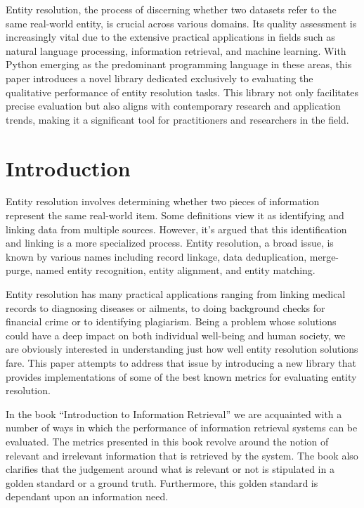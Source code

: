 \documentclass[11pt]{article}
\begin{document}
    \theoremstyle{definition}
    \newtheorem{defn}{Definition}[section]
    
    \abstract\label{abstract}

    Entity resolution, the process of discerning whether two datasets refer to
    the same real-world entity, is crucial across various domains.
    Its quality assessment is increasingly vital due to the extensive practical
    applications in fields such as natural language processing, information
    retrieval, and machine learning.
    With Python emerging as the predominant programming language in these areas,
    this paper introduces a novel library dedicated exclusively to evaluating
    the qualitative performance of entity resolution tasks.
    This library not only facilitates precise evaluation but also aligns with
    contemporary research and application trends, making it a significant tool
    for practitioners and researchers in the field.


    \section{Introduction}\label{sec:introduction}
    Entity resolution involves determining whether two pieces of information
    represent the same real-world item.
    Some definitions view it as identifying and linking data from multiple
    sources\cite{Qia17}.
    However, it's argued that this identification and linking is a more
    specialized process\cite{Tal11}.
    Entity resolution, a broad issue, is known by various names including record
    linkage, data deduplication, merge-purge, named entity recognition, entity
    alignment, and entity matching.

    Entity resolution has many practical applications ranging from linking
    medical records to diagnosing diseases or ailments, to doing background
    checks for financial crime or to identifying plagiarism.
    Being a problem whose solutions could have a deep impact on both individual
    well-being and human society, we are obviously interested in understanding
    just how well entity resolution solutions fare.
    This paper attempts to address that issue by introducing a new library that
    provides implementations of some of the best known metrics for evaluating
    entity resolution.

    In the book ``Introduction to Information Retrieval'' we are acquainted with
    a number of ways in which the performance of information retrieval systems
    can be evaluated\cite{manning2008}.
    The metrics presented in this book revolve around the notion of relevant and
    irrelevant information that is retrieved by the system.
    The book also clarifies that the judgement around what is relevant or not is
    stipulated in a golden standard or a ground truth.
    Furthermore, this golden standard is dependant upon an information need.
\end{document}
